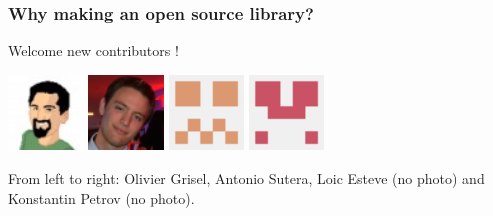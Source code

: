 \documentclass[11pt,compress,serif]{beamer}
\begin{document}
\begin{frame}[fragile=singleslide]
\frametitle{Why making an open source library?}


\begin{block}{Welcome new contributors !}
\begin{center}
\includegraphics[width=2cm]{contrib_ogrisel}
\includegraphics[width=2cm]{contrib_asutera}
\includegraphics[width=2cm]{contrib_lesteve}
\includegraphics[width=2cm]{contrib_kpetrov}
\end{center}

\begin{small}
From left to right: Olivier Grisel, Antonio Sutera,  
Loic Esteve (no photo) and Konstantin Petrov (no photo).
\end{small}

\end{block}

\end{frame}

\end{document}
